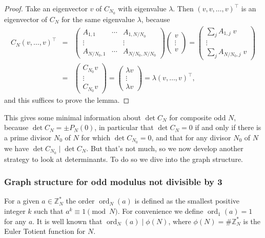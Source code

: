 \documentclass[10pt]{article}
\theoremstyle{definition}
\newcommand{\Z}{\mathbb{Z}}
\DeclareMathOperator{\ord}{ord}
\begin{document}
\begin{proof}
    Take an eigenvector $ v $ of $ C_{N_0} $ with eigenvalue $ \lambda $. Then $ (v,v,\ldots,v)^{\top} $ is
    an eigenvector of $ C_N $ for the same eigenvalue $ \lambda $, because
    \begin{eqnarray*}
        C_N (v,\ldots,v)^{\top} & = &
        \begin{pmatrix} A_{1,1}     & \cdots & A_{1,N/N_0}     \\
            \vdots      &        & \vdots          \\
            A_{N/N_0,1} & \cdots & A_{N/N_0,N/N_0} \end{pmatrix}
        \begin{pmatrix} v \\ \vdots \\ v \end{pmatrix} =
        \begin{pmatrix} \sum_j A_{1,j} \; v \\ \vdots \\ \sum_j A_{N/N_0,j} \; v \end{pmatrix} \\
        & = & \begin{pmatrix} C_{N_0} v \\ \vdots \\ C_{N_0} v \end{pmatrix} =
        \begin{pmatrix} \lambda v \\ \vdots \\ \lambda v \end{pmatrix} = \lambda (v,\ldots,v)^{\top} ,
    \end{eqnarray*}
    and this suffices to prove the lemma.
\end{proof}

This gives some minimal information about $ \det C_N $ for composite odd $ N $, because
$ \det C_N = \pm P_N(0) $, in particular that $ \det C_N = 0 $ if and only if there is a prime divisor
$ N_0 $ of $ N $ for which $ \det C_{N_0} = 0 $, and that for any divisor $ N_0 $ of $ N $ we have
$ \det C_{N_0} \mid \det C_N $. But that's not much, so we now develop another strategy to look at
determinants. To do so we dive into the graph structure.

\subsubsection{Graph structure for odd modulus not divisible by 3} \label{sec:graphstructurenotdiv3}
For a given $ a \in \Z_N^{\ast} $ the order $ \ord_N(a) $ is defined as the smallest positive integer
$ k $ such that $ a^k \equiv 1 \pmod{N} $. For convenience we define $ \ord_1(a) = 1 $ for any $ a $.
It is well known that $ \ord_N(a) \mid \phi(N) $, where $ \phi(N) = \# \Z_N^{\ast} $ is the Euler
Totient function for $ N $.
\end{document}
